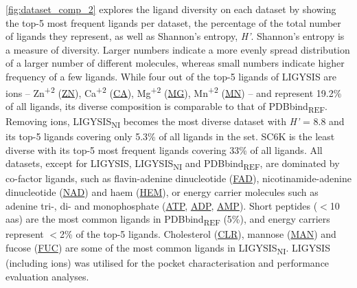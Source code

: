 \autoref{fig:dataset_comp_2} explores the ligand diversity on each dataset by showing the top-5 most frequent ligands per dataset, the percentage of the total number of ligands they represent, as well as Shannon's entropy, \textit{H'}. Shannon's entropy is a measure of diversity. Larger numbers indicate a more evenly spread distribution of a larger number of different molecules, whereas small numbers indicate higher frequency of a few ligands. While four out of the top-5 ligands of LIGYSIS are ions -- Zn\textsuperscript{+2} (\href{https://www.ebi.ac.uk/pdbe-srv/pdbechem/chemicalCompound/show/ZN}{ZN}), Ca\textsuperscript{+2} (\href{https://www.ebi.ac.uk/pdbe-srv/pdbechem/chemicalCompound/show/CA}{CA}), Mg\textsuperscript{+2} (\href{https://www.ebi.ac.uk/pdbe-srv/pdbechem/chemicalCompound/show/MG}{MG}), Mn\textsuperscript{+2} (\href{https://www.ebi.ac.uk/pdbe-srv/pdbechem/chemicalCompound/show/MN}{MN}) -- and represent 19.2\% of all ligands, its diverse composition is comparable to that of PDBbind\textsubscript{REF}. Removing ions, LIGYSIS\textsubscript{NI} becomes the most diverse dataset with \textit{H'} = 8.8 and its top-5 ligands covering only 5.3\% of all ligands in the set. SC6K is the least diverse with its top-5 most frequent ligands covering 33\% of all ligands. All datasets, except for LIGYSIS, LIGYSIS\textsubscript{NI} and PDBbind\textsubscript{REF}, are dominated by co-factor ligands, such as flavin-adenine dinucleotide (\href{https://www.ebi.ac.uk/pdbe-srv/pdbechem/chemicalCompound/show/FAD}{FAD}), nicotinamide-adenine dinucleotide (\href{https://www.ebi.ac.uk/pdbe-srv/pdbechem/chemicalCompound/show/NAD}{NAD}) and haem (\href{https://www.ebi.ac.uk/pdbe-srv/pdbechem/chemicalCompound/show/HEM}{HEM}), or energy carrier molecules such as adenine tri-, di- and monophosphate (\href{https://www.ebi.ac.uk/pdbe-srv/pdbechem/chemicalCompound/show/ATP}{ATP}, \href{https://www.ebi.ac.uk/pdbe-srv/pdbechem/chemicalCompound/show/ADP}{ADP}, \href{https://www.ebi.ac.uk/pdbe-srv/pdbechem/chemicalCompound/show/AMP}{AMP}). Short peptides ($<$10 aas) are the most common ligands in PDBbind\textsubscript{REF} (5\%), and energy carriers represent $<$2\% of the top-5 ligands. Cholesterol (\href{https://www.ebi.ac.uk/pdbe-srv/pdbechem/chemicalCompound/show/CLR}{CLR}), mannose (\href{https://www.ebi.ac.uk/pdbe-srv/pdbechem/chemicalCompound/show/MAN}{MAN}) and fucose (\href{https://www.ebi.ac.uk/pdbe-srv/pdbechem/chemicalCompound/show/FUC}{FUC}) are some of the most common ligands in LIGYSIS\textsubscript{NI}. LIGYSIS (including ions) was utilised for the pocket characterisation and performance evaluation analyses.

